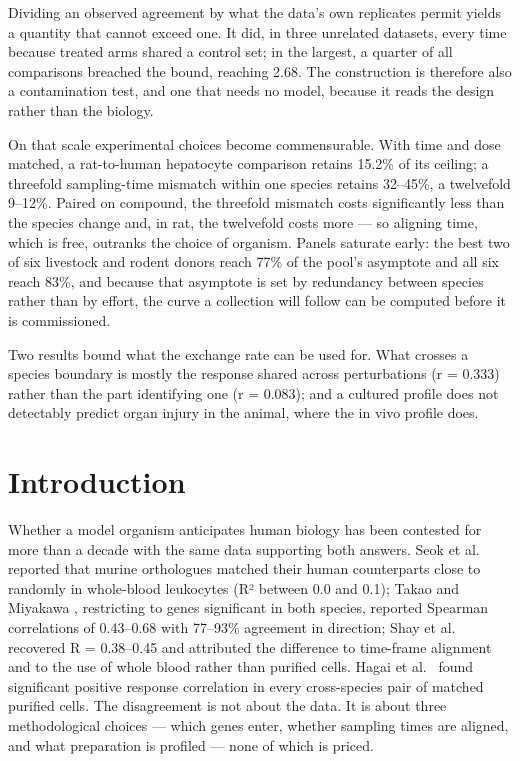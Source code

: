 \documentclass[11pt,a4paper]{article}
\begin{document}
Dividing an observed agreement by what the data's own replicates permit
yields a quantity that cannot exceed one. It did, in three unrelated
datasets, every time because treated arms shared a control set; in the
largest, a quarter of all comparisons breached the bound, reaching 2.68.
The construction is therefore also a contamination test, and one that
needs no model, because it reads the design rather than the biology.

On that scale experimental choices become commensurable. With time and
dose matched, a rat-to-human hepatocyte comparison retains 15.2\% of its
ceiling; a threefold sampling-time mismatch within one species retains
32--45\%, a twelvefold 9--12\%. Paired on compound, the threefold
mismatch costs significantly less than the species change and, in rat,
the twelvefold costs more --- so aligning time, which is free, outranks
the choice of organism. Panels saturate early: the best two of six
livestock and rodent donors reach 77\% of the pool's asymptote and all
six reach 83\%, and because that asymptote is set by redundancy between
species rather than by effort, the curve a collection will follow can be
computed before it is commissioned.

Two results bound what the exchange rate can be used for. What crosses a
species boundary is mostly the response shared across perturbations (r =
0.333) rather than the part identifying one (r = 0.083); and a cultured
profile does not detectably predict organ injury in the animal, where
the in vivo profile does.

\endgroup
\clearpage

\section{Introduction}\label{introduction}

Whether a model organism anticipates human biology has been contested
for more than a decade with the same data supporting both answers. Seok
et al.~\cite{ref1} reported that murine orthologues matched their human
counterparts close to randomly in whole-blood leukocytes (R² between 0.0
and 0.1); Takao and Miyakawa \cite{ref2}, restricting to genes significant
in both species, reported Spearman correlations of 0.43--0.68 with
77--93\% agreement in direction; Shay et al.~\cite{ref3} recovered R =
0.38--0.45 and attributed the difference to time-frame alignment and to
the use of whole blood rather than purified cells. Hagai et al.~\cite{ref4}
found significant positive response correlation in every cross-species
pair of matched purified cells. The disagreement is not about the data.
It is about three methodological choices --- which genes enter, whether
sampling times are aligned, and what preparation is profiled --- none of
which is priced.
\end{document}
